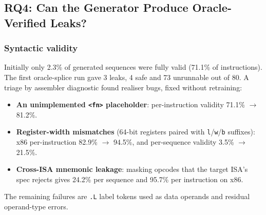\documentclass[conference]{IEEEtran}
\begin{document}

\subsection{RQ4: Can the Generator Produce Oracle-Verified Leaks?}
\label{sec:rq-gen}

\subsubsection{Syntactic validity}
\label{sec:gensyntax}
Initially only 2.3\% of generated sequences were fully valid (71.1\% of
instructions). The first oracle-splice run gave 3 leaks, 4 safe and 73
unrunnable out of 80. A triage by assembler diagnostic found realiser bugs,
fixed without retraining:
\begin{itemize}[itemsep=1pt,leftmargin=1.2em]
  \item \textbf{An unimplemented \texttt{<fn>} placeholder}: per-instruction
    validity 71.1\% $\to$ 81.2\%.
  \item \textbf{Register-width mismatches} (64-bit registers paired with
    \texttt{l}/\texttt{w}/\texttt{b} suffixes): x86 per-instruction 82.9\%
    $\to$ 94.5\%, and per-sequence validity 3.5\% $\to$ 21.5\%.
  \item \textbf{Cross-ISA mnemonic leakage}: masking opcodes that the target
    ISA's spec rejects gives 24.2\% per sequence and 95.7\% per instruction
    on x86.
\end{itemize}
The remaining failures are \texttt{.L} label tokens used as data operands and
residual operand-type errors.
\end{document}
